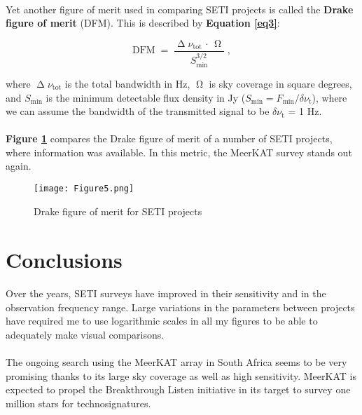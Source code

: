 \documentclass{article}
\begin{document}
\paragraph{}
Yet another figure of merit used in comparing SETI projects is called the \textbf{Drake figure of merit} (DFM). This is described by \textbf{Equation \ref{eq3}}:

\begin{equation}
\textrm{DFM} \; = \; \frac{\upDelta \nu_{\textrm{tot}} \, \cdot \, \upOmega}{S_{\textrm{min}}^{3/2}} \; ,
\label{eq3}
\end{equation}

where $\upDelta \nu_{\textrm{tot}}$ is the total bandwidth in Hz, $\upOmega$ is sky coverage in square degrees, and $S_{\textrm{min}}$ is the minimum detectable flux density in Jy ($S_{\textrm{min}} = F_{\textrm{min}} / \delta \nu_{\textrm{t}}$), where we can assume the bandwidth of the transmitted signal to be $\delta \nu_{\textrm{t}}$ = 1 Hz.

\paragraph{}
\textbf{Figure \ref{fig6}} compares the Drake figure of merit of a number of SETI projects, where information was available. In this metric, the MeerKAT survey stands out again.

\begin{figure}[H]
\begin{center}
\texttt{[image: Figure5.png]}
\caption{Drake figure of merit for SETI projects \textbf{\label{fig6}}}
\end{center}
\end{figure}


\section{Conclusions}

\paragraph{}
Over the years, SETI surveys have improved in their sensitivity and in the observation frequency range. Large variations in the parameters between projects have required me to use logarithmic scales in all my figures to be able to adequately make visual comparisons.

\paragraph{}
The ongoing search using the MeerKAT array in South Africa seems to be very promising thanks to its large sky coverage as well as high sensitivity. MeerKAT is expected to propel the Breakthrough Listen initiative in its target to survey one million stars for technosignatures.
\end{document}
